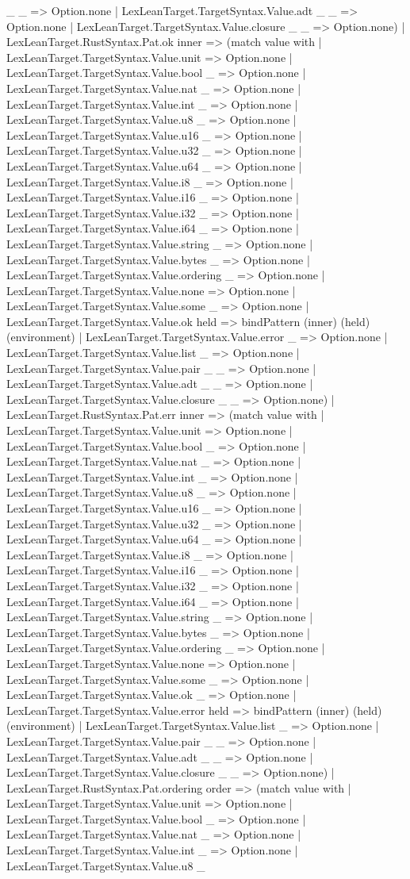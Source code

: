\documentclass[11pt]{article}
\begin{document}
\_ \_ => Option.none | LexLeanTarget.TargetSyntax.Value.adt \_ \_ => Option.none | LexLeanTarget.TargetSyntax.Value.closure \_ \_ => Option.none) | LexLeanTarget.RustSyntax.Pat.ok inner => (match value with | LexLeanTarget.TargetSyntax.Value.unit => Option.none | LexLeanTarget.TargetSyntax.Value.bool \_ => Option.none | LexLeanTarget.TargetSyntax.Value.nat \_ => Option.none | LexLeanTarget.TargetSyntax.Value.int \_ => Option.none | LexLeanTarget.TargetSyntax.Value.u8 \_ => Option.none | LexLeanTarget.TargetSyntax.Value.u16 \_ => Option.none | LexLeanTarget.TargetSyntax.Value.u32 \_ => Option.none | LexLeanTarget.TargetSyntax.Value.u64 \_ => Option.none | LexLeanTarget.TargetSyntax.Value.i8 \_ => Option.none | LexLeanTarget.TargetSyntax.Value.i16 \_ => Option.none | LexLeanTarget.TargetSyntax.Value.i32 \_ => Option.none | LexLeanTarget.TargetSyntax.Value.i64 \_ => Option.none | LexLeanTarget.TargetSyntax.Value.string \_ => Option.none | LexLeanTarget.TargetSyntax.Value.bytes \_ => Option.none | LexLeanTarget.TargetSyntax.Value.ordering \_ => Option.none | LexLeanTarget.TargetSyntax.Value.none => Option.none | LexLeanTarget.TargetSyntax.Value.some \_ => Option.none | LexLeanTarget.TargetSyntax.Value.ok held => bindPattern (inner) (held) (environment) | LexLeanTarget.TargetSyntax.Value.error \_ => Option.none | LexLeanTarget.TargetSyntax.Value.list \_ => Option.none | LexLeanTarget.TargetSyntax.Value.pair \_ \_ => Option.none | LexLeanTarget.TargetSyntax.Value.adt \_ \_ => Option.none | LexLeanTarget.TargetSyntax.Value.closure \_ \_ => Option.none) | LexLeanTarget.RustSyntax.Pat.err inner => (match value with | LexLeanTarget.TargetSyntax.Value.unit => Option.none | LexLeanTarget.TargetSyntax.Value.bool \_ => Option.none | LexLeanTarget.TargetSyntax.Value.nat \_ => Option.none | LexLeanTarget.TargetSyntax.Value.int \_ => Option.none | LexLeanTarget.TargetSyntax.Value.u8 \_ => Option.none | LexLeanTarget.TargetSyntax.Value.u16 \_ => Option.none | LexLeanTarget.TargetSyntax.Value.u32 \_ => Option.none | LexLeanTarget.TargetSyntax.Value.u64 \_ => Option.none | LexLeanTarget.TargetSyntax.Value.i8 \_ => Option.none | LexLeanTarget.TargetSyntax.Value.i16 \_ => Option.none | LexLeanTarget.TargetSyntax.Value.i32 \_ => Option.none | LexLeanTarget.TargetSyntax.Value.i64 \_ => Option.none | LexLeanTarget.TargetSyntax.Value.string \_ => Option.none | LexLeanTarget.TargetSyntax.Value.bytes \_ => Option.none | LexLeanTarget.TargetSyntax.Value.ordering \_ => Option.none | LexLeanTarget.TargetSyntax.Value.none => Option.none | LexLeanTarget.TargetSyntax.Value.some \_ => Option.none | LexLeanTarget.TargetSyntax.Value.ok \_ => Option.none | LexLeanTarget.TargetSyntax.Value.error held => bindPattern (inner) (held) (environment) | LexLeanTarget.TargetSyntax.Value.list \_ => Option.none | LexLeanTarget.TargetSyntax.Value.pair \_ \_ => Option.none | LexLeanTarget.TargetSyntax.Value.adt \_ \_ => Option.none | LexLeanTarget.TargetSyntax.Value.closure \_ \_ => Option.none) | LexLeanTarget.RustSyntax.Pat.ordering order => (match value with | LexLeanTarget.TargetSyntax.Value.unit => Option.none | LexLeanTarget.TargetSyntax.Value.bool \_ => Option.none | LexLeanTarget.TargetSyntax.Value.nat \_ => Option.none | LexLeanTarget.TargetSyntax.Value.int \_ => Option.none | LexLeanTarget.TargetSyntax.Value.u8 \_ 
\end{document}
